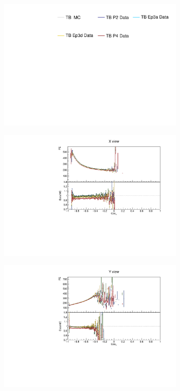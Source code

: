 \begin{figure}[!ht]
  \begin{subfigure}{\textwidth}
  \centering
    \includegraphics[height=0.2\linewidth]{essentialsec_tb/legend.pdf}
  \end{subfigure}
  \vspace*{2mm}

  \begin{subfigure}{0.495\textwidth}
    \includegraphics[width=\linewidth]{PlotsAngularDistribution/pe_cosy_x.pdf}
  \end{subfigure}
  \begin{subfigure}{0.495\textwidth}
    \includegraphics[width=\linewidth]{PlotsAngularDistribution/pe_cosy_y.pdf}

\end{subfigure}
\end{figure}
